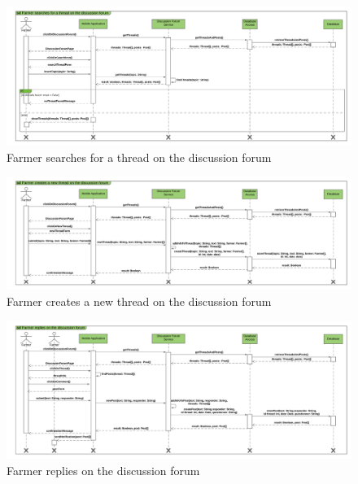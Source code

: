 \newpage
\begin{landscape}
\begin{figure}[h]
\vspace*{-2cm}
\noindent
\centering
\centerline{\includegraphics[scale= 0.108]{./Images/Farmer searches for a thread on the discussion forum.png}}
    \caption{Farmer searches for a thread on the discussion forum}
    \vspace*{-12cm}
\end{figure}
\fillandplacepagenumber
\end{landscape}


\newpage
\begin{landscape}
\begin{figure}[h]
\vspace*{-2cm}
\noindent
\centering
\centerline{\includegraphics[scale= 0.108]{./Images/Farmer creates a new thread on the discussion forum.png}}
    \caption{Farmer creates a new thread on the discussion forum}
    \vspace*{-12cm}
\end{figure}
\fillandplacepagenumber
\end{landscape}


\newpage
\begin{landscape}
\begin{figure}[h]
\vspace*{-2cm}
\noindent
\centering
\centerline{\includegraphics[scale= 0.108]{./Images/Farmer replies on the discussion forum.png}}
    \caption{Farmer replies on the discussion forum}
    \vspace*{-12cm}
\end{figure}
\fillandplacepagenumber
\end{landscape}


